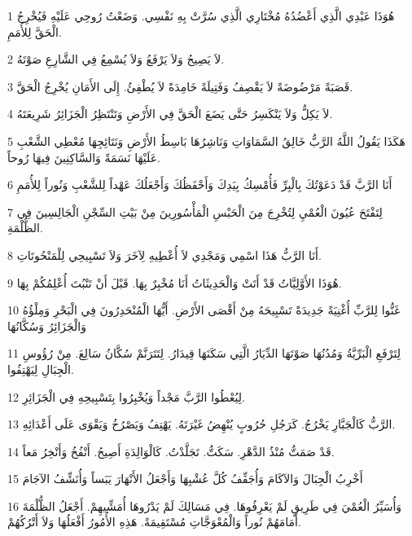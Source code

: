 \par 1 هُوَذَا عَبْدِي الَّذِي أَعْضُدُهُ مُخْتَارِي الَّذِي سُرَّتْ بِهِ نَفْسِي. وَضَعْتُ رُوحِي عَلَيْهِ فَيُخْرِجُ الْحَقَّ لِلأُمَمِ.
\par 2 لاَ يَصِيحُ وَلاَ يَرْفَعُ وَلاَ يُسْمِعُ فِي الشَّارِعِ صَوْتَهُ.
\par 3 قَصَبَةً مَرْضُوضَةً لاَ يَقْصِفُ وَفَتِيلَةً خَامِدَةً لاَ يُطْفِئُ. إِلَى الأَمَانِ يُخْرِجُ الْحَقَّ.
\par 4 لاَ يَكِلُّ وَلاَ يَنْكَسِرُ حَتَّى يَضَعَ الْحَقَّ فِي الأَرْضِ وَتَنْتَظِرُ الْجَزَائِرُ شَرِيعَتَهُ.
\par 5 هَكَذَا يَقُولُ اللَّهُ الرَّبُّ خَالِقُ السَّمَاوَاتِ وَنَاشِرُهَا بَاسِطُ الأَرْضِ وَنَتَائِجِهَا مُعْطِي الشَّعْبِ عَلَيْهَا نَسَمَةً وَالسَّاكِنِينَ فِيهَا رُوحاً.
\par 6 أَنَا الرَّبَّ قَدْ دَعَوْتُكَ بِالْبِرِّ فَأُمْسِكُ بِيَدِكَ وَأَحْفَظُكَ وَأَجْعَلُكَ عَهْداً لِلشَّعْبِ وَنُوراً لِلأُمَمِ
\par 7 لِتَفْتَحَ عُيُونَ الْعُمْيِ لِتُخْرِجَ مِنَ الْحَبْسِ الْمَأْسُورِينَ مِنْ بَيْتِ السِّجْنِ الْجَالِسِينَ فِي الظُّلْمَةِ.
\par 8 أَنَا الرَّبُّ هَذَا اسْمِي وَمَجْدِي لاَ أُعْطِيهِ لِآخَرَ وَلاَ تَسْبِيحِي لِلْمَنْحُوتَاتِ.
\par 9 هُوَذَا الأَوَّلِيَّاتُ قَدْ أَتَتْ وَالْحَدِيثَاتُ أَنَا مُخْبِرٌ بِهَا. قَبْلَ أَنْ تَنْبُتَ أُعْلِمُكُمْ بِهَا.
\par 10 غَنُّوا لِلرَّبِّ أُغْنِيَةً جَدِيدَةً تَسْبِيحَهُ مِنْ أَقْصَى الأَرْضِ. أَيُّهَا الْمُنْحَدِرُونَ فِي الْبَحْرِ وَمِلْؤُهُ وَالْجَزَائِرُ وَسُكَّانُهَا
\par 11 لِتَرْفَعِ الْبَرِّيَّةُ وَمُدُنُهَا صَوْتَهَا الدِّيَارُ الَّتِي سَكَنَهَا قِيدَارُ. لِتَتَرَنَّمْ سُكَّانُ سَالِعَ. مِنْ رُؤُوسِ الْجِبَالِ لِيَهْتِفُوا.
\par 12 لِيُعْطُوا الرَّبَّ مَجْداً وَيُخْبِرُوا بِتَسْبِيحِهِ فِي الْجَزَائِرِ.
\par 13 الرَّبُّ كَالْجَبَّارِ يَخْرُجُ. كَرَجُلِ حُرُوبٍ يُنْهِضُ غَيْرَتَهُ. يَهْتِفُ وَيَصْرُخُ وَيَقْوَى عَلَى أَعْدَائِهِ.
\par 14 قَدْ صَمَتُّ مُنْذُ الدَّهْرِ. سَكَتُّ. تَجَلَّدْتُ. كَالْوَالِدَةِ أَصِيحُ. أَنْفُخُ وَأَنْخِرُ مَعاً.
\par 15 أَخْرِبُ الْجِبَالَ وَالآكَامَ وَأُجَفِّفُ كُلَّ عُشْبِهَا وَأَجْعَلُ الأَنْهَارَ يَبَساً وَأُنَشِّفُ الآجَامَ
\par 16 وَأُسَيِّرُ الْعُمْيَ فِي طَرِيقٍ لَمْ يَعْرِفُوهَا. فِي مَسَالِكَ لَمْ يَدْرُوهَا أُمَشِّيهِمْ. أَجْعَلُ الظُّلْمَةَ أَمَامَهُمْ نُوراً وَالْمُعْوَجَّاتِ مُسْتَقِيمَةً. هَذِهِ الأُمُورُ أَفْعَلُهَا وَلاَ أَتْرُكُهُمْ.
